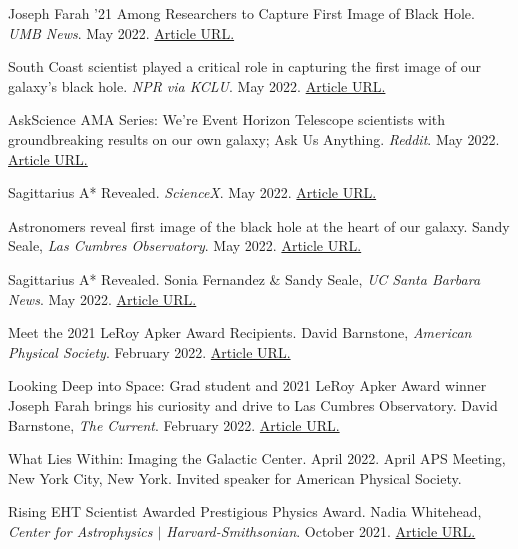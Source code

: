 \documentclass[margin,line]{res}
\begin{document}
\begin{resume}
Joseph Farah '21 Among Researchers to Capture First Image of Black Hole.
\textit{UMB News}. May 2022. {\color{blue}\href{https://www.umb.edu/news/detail/joseph_farah_21_among_researchers_to_capture_first_image_of_black_hole}{Article URL.}}

South Coast scientist played a critical role in capturing the first image of our galaxy's black hole. \textit{NPR via KCLU}. May 2022. {\color{blue}\href{https://www.kclu.org/local-news/2022-05-12/south-coast-scientist-played-a-critical-role-in-capturing-the-first-image-of-our-galaxys-black-hole}{Article URL.}}

AskScience AMA Series: We're Event Horizon Telescope scientists with groundbreaking results on our own galaxy; Ask Us Anything. \textit{Reddit}. May 2022. {\color{blue}\href{https://old.reddit.com/r/askscience/comments/unyg77/askscience_ama_series_were_event_horizon/}{Article URL.}}

Sagittarius A* Revealed. \textit{ScienceX}. May 2022. {\color{blue}\href{https://sciencex.com/wire-news/413826795/sagittarius-a-revealed.html}{Article URL.}}

Astronomers reveal first image of the black hole at the heart of our galaxy. Sandy Seale, \textit{Las Cumbres Observatory}. May 2022. {\color{blue}\href{https://lco.global/news/astronomers-reveal-first-image-of-the-black-hole-at-the-heart-of-our-galaxy/}{Article URL.}}


Sagittarius A* Revealed. Sonia Fernandez \& Sandy Seale, \textit{UC Santa Barbara News}. May 2022. {\color{blue}\href{https://www.news.ucsb.edu/2022/020632/astronomers-reveal-first-image-black-hole-heart-our-galaxy}{Article URL.}}


Meet the 2021 LeRoy Apker Award Recipients. David Barnstone, \textit{American Physical Society}. February 2022. {\color{blue}\href{https://www.aps.org/publications/apsnews/202202/apker.cfm}{Article URL.}}

Looking Deep into Space: Grad student and 2021 LeRoy Apker Award winner Joseph Farah brings his curiosity and drive to Las Cumbres Observatory. David Barnstone, \textit{The Current}. February 2022. {\color{blue}\href{https://www.news.ucsb.edu/2022/020559/looking-deep-space}{Article URL.}}

What Lies Within: Imaging the Galactic Center. April 2022. April APS Meeting, New York City, New York. Invited speaker for American Physical Society.

Rising EHT Scientist Awarded Prestigious Physics Award. Nadia Whitehead, \textit{Center for Astrophysics $\vert$ Harvard-Smithsonian}. October 2021. {\color{blue}\href{https://www.cfa.harvard.edu/news/rising-eht-scientist-awarded-prestigious-physics-award}{Article URL.}}


\end{resume}
\end{document}
